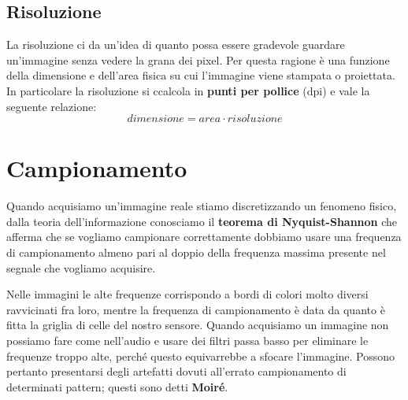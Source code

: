 \subsection{Risoluzione}
La risoluzione ci da un'idea di quanto possa essere gradevole guardare un'immagine senza vedere la grana dei pixel. Per questa ragione è una funzione della dimensione e dell'area fisica su cui l'immagine viene stampata o proiettata. In particolare la risoluzione si ccalcola in \textbf{punti per pollice} (dpi) e vale la seguente relazione:
\begin{equation}
	dimensione = area \cdot risoluzione
\end{equation}

\section{Campionamento}
Quando acquisiamo un'immagine reale stiamo discretizzando un fenomeno fisico, dalla teoria dell'informazione conosciamo il \textbf{teorema di Nyquist-Shannon} che afferma che se vogliamo campionare correttamente dobbiamo usare una frequenza di campionamento almeno pari al doppio della frequenza massima presente nel segnale che vogliamo acquisire.

Nelle immagini le alte frequenze corrispondo a bordi di colori molto diversi ravvicinati fra loro, mentre la frequenza di campionamento è data da quanto è fitta la griglia di celle del nostro sensore. Quando acquisiamo un immagine non possiamo fare come nell'audio e usare dei filtri passa basso per eliminare le frequenze troppo alte, perché questo equivarrebbe a sfocare l'immagine. Possono pertanto presentarsi degli artefatti dovuti all'errato campionamento di determinati pattern; questi sono detti \textbf{Moiré}.